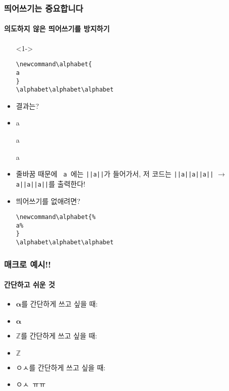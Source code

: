 \begin{frame}[fragile]
  \frametitle{띄어쓰기는 중요합니다}
  \framesubtitle{의도하지 않은 띄어쓰기를 방지하기}
  \begin{itemize}
    \item[\mysymbol\;]<1-> \vspace{-1.5em}\begin{verbatim}
\newcommand\alphabet{
a
}
\alphabet\alphabet\alphabet
    \end{verbatim}
    \item<1-> 결과는?
    \item<2-> \newcommand\alphabet{
a
}
      \alphabet\alphabet\alphabet
  \item<3-> 줄바꿈 때문에 \texttt{\alphabet}에는 \texttt{|\textvisiblespace|a|\textvisiblespace|}가 들어가서, 저 코드는 \texttt{|\textvisiblespace|a|\textvisiblespace\textvisiblespace|a|\textvisiblespace\textvisiblespace|a|\textvisiblespace|} $\to$ \texttt{a|\textvisiblespace|a|\textvisiblespace|a|\textvisiblespace|}를 출력한다!
  \item<4->띄어쓰기를 없애려면?
  
  \vspace{-2em}\begin{verbatim}
\newcommand\alphabet{%
a%
}
\alphabet\alphabet\alphabet
  \end{verbatim}
\end{itemize}
\end{frame}

\begin{frame}[fragile]
  \frametitle{매크로 예시!!}
  \framesubtitle{간단하고 쉬운 것}
  \begin{itemize}
    \item $\boldsymbol{\alpha}$를 간단하게 쓰고 싶을 때:
    \item \texttt{\newcommand{\bsalpha}{\boldsymbol{\alpha}}} \newcommand{\bsalpha}{$\boldsymbol{\alpha}$} \bsalpha
    \item $\mathbb Z$를 간단하게 쓰고 싶을 때:
    \item \texttt{\newcommand{\ZZ}{\mathbb{Z}}} \newcommand{\ZZ}{{\mathbb Z}} $\ZZ$
    \item {ㅇㅅ\kern1pt}를 간단하게 쓰고 싶을 때:
    \item \texttt{\newcommand{\furueru}[1][ㅇㅅ]{#1\kern1pt\llap{#1}}} \newcommand{\furueru}[1][ㅇㅅ]{#1\kern1pt\llap{#1}} \furueru\ \furueru[ㅠㅠ]
  \end{itemize}
\end{frame}


